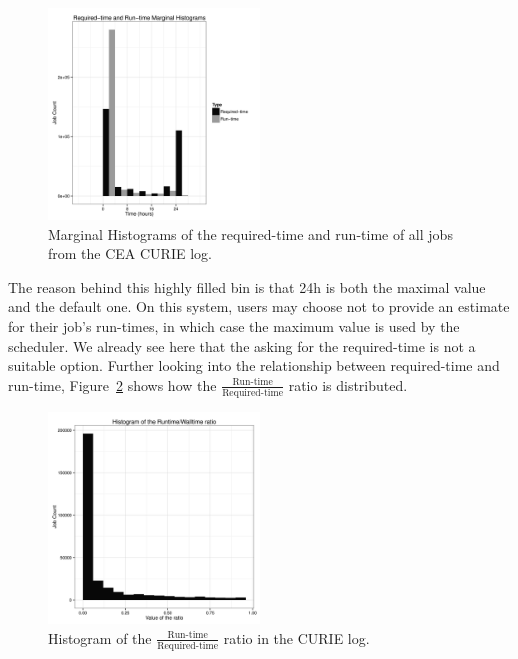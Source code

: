 \documentclass{article}
\begin{document}
\begin{figure}[ht]
  \centering
  \includegraphics[width=0.5\textwidth]{reqrun-0.png}
  \caption{Marginal Histograms of the required-time and run-time of all jobs from the CEA CURIE log.}
  \label{fig:_wall_run_for_report_pdf}
\end{figure}

The reason behind this highly filled bin is that 24h is both the maximal value and the default one. On this system, users may choose not to provide an estimate for their job's run-times, in which case the maximum value is used by the scheduler. We already see here that the asking for the required-time is not a suitable option.
Further looking into the relationship between required-time and run-time, Figure~\ref{fig:ratio} shows how the $\frac{\mbox{Run-time}}{\mbox{Required-time}}$ ratio is distributed.

\begin{figure}[ht]
  \centering
  \includegraphics[width=0.5\textwidth]{reqrun-1.png}
  \caption{Histogram of the $\frac{\mbox{Run-time}}{\mbox{Required-time}}$ ratio in the CURIE log.}
  \label{fig:ratio}
\end{figure}
\end{document}
